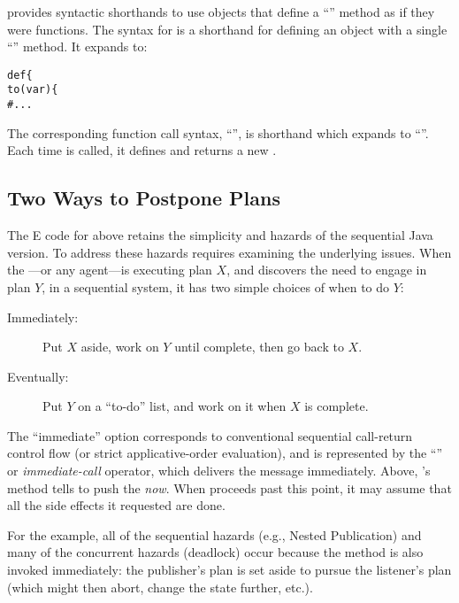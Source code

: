\documentclass{llncs}
\begin{document}
 provides syntactic shorthands to use objects that define a
``'' method as if they were functions. The syntax for
 is a shorthand for defining an object with a
single ``'' method. It expands to:
%
\begin{alltt}
    def  \{
        to (var ) \{
            # ...
\end{alltt}
%
The corresponding function call syntax,
``'', is shorthand which expands to
``''. Each time  is
called, it defines and returns a new .

\subsection{Two Ways to Postpone Plans}

The E code for  above retains the simplicity and
hazards of the sequential Java version.  To address these hazards
requires examining the underlying issues.  When the
---or any agent---is executing plan $X$, and
discovers the need to engage in plan $Y$, in a sequential system, it
has two simple choices of when to do $Y$:
%
\begin{description}

\item[Immediately:] Put $X$ aside, work on $Y$ until
complete, then go back to $X$.

\item[Eventually:] Put $Y$ on a ``to-do'' list, and work on it
when $X$ is complete.

\end{description}
%
The ``immediate'' option corresponds to conventional sequential
call-return control flow (or strict applicative-order evaluation), and
is represented by the ``'' or \emph{immediate-call} operator,
which delivers the message immediately. Above, 's
 method tells  to push the
 \emph{now}. When  proceeds past
this point, it may assume that all the side effects it requested are
done.

For the  example, all of the sequential hazards
(e.g., Nested Publication) and many of the concurrent hazards
(deadlock) occur because the  method is also
invoked immediately: the publisher's plan is set aside to pursue the
listener's plan (which might then abort, change the state further,
etc.).
\end{document}
